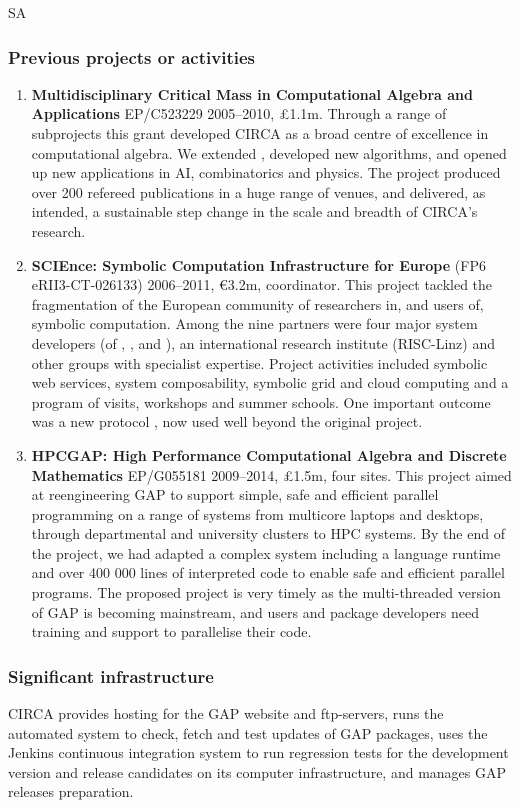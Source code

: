 \begin{sitedescription}{SA}
\subsubsection*{Previous projects or activities}

\begin{enumerate}
\item
\textbf{Multidisciplinary Critical Mass in Computational
Algebra and Applications} EP/C523229 2005--2010, \pounds 1.1m.
Through a range of subprojects this grant developed CIRCA as 
a broad centre of excellence in computational algebra. We 
extended \GAP, developed new algorithms, and opened up new 
applications in AI, combinatorics and physics. The project 
produced over 200 refereed publications in a huge range of 
venues, and delivered, as intended, a sustainable step change 
in the scale and breadth of CIRCA's research.
\item 
\textbf{SCIEnce: Symbolic Computation Infrastructure for Europe}
(FP6 eRII3-CT-026133) 2006--2011, \euro 3.2m, coordinator.
This project tackled the fragmentation of the European community 
of researchers in, and users of, symbolic computation. Among the 
nine partners were four major system developers (of \GAP, \Maple, 
\MuPAD and \KANT), an international research institute (RISC-Linz) 
and other groups with specialist expertise. Project activities 
included symbolic web services, system composability, symbolic 
grid and cloud computing and a program of visits, workshops and 
summer schools. One important outcome was a new protocol \SCSCP, 
now used well beyond the original project.
\item
\textbf{HPCGAP: High Performance Computational Algebra and Discrete Mathematics} 
EP/G055181 2009--2014, \pounds 1.5m, four sites. This project aimed
at reengineering GAP to support simple, safe and efficient parallel 
programming on a range of systems from multicore laptops and desktops, 
through departmental and university clusters to HPC systems. By the 
end of the project, we had adapted a complex system including a 
language runtime and over 400 000 lines of interpreted code to enable 
safe and efficient parallel programs. The proposed project is very timely as
the multi-threaded version of GAP is becoming mainstream, and users and 
package developers need training and support to parallelise their code.
\end{enumerate}

\subsubsection*{Significant infrastructure}

CIRCA provides hosting for the GAP website and ftp-servers, runs the 
automated system to check, fetch and test updates of GAP packages, uses 
the Jenkins continuous integration system to run regression tests for the 
development version and release candidates on its computer infrastructure, 
and manages GAP releases preparation.
\end{sitedescription}

